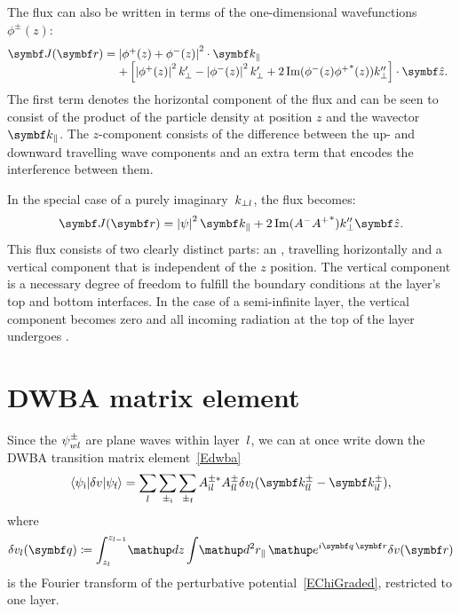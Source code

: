 The flux can also be written in terms of the one-dimensional wavefunctions $\phi^{\pm}(z)$:
\begin{equation}
  \begin{array}{@{}l@{\;}l}
  \v{J}(\r) =& \left|\phi^+(z)+\phi^-(z)\right|^2\cdot\k_\plll \\
  &+ \left[ \left|\phi^+(z)\right|^2 k_\perp' - \left|\phi^-(z)\right|^2 k_\perp' +
  2\Im(\phi^-(z){\phi^+}^*(z))k_\perp'' \right]\cdot \v{\hat z}.
  \end{array}
\end{equation}
The first term denotes the horizontal component of the flux and can be seen to consist of the product
of the particle density at position $z$ and the wavector $\k_\plll$. The $z$-component consists of the difference between the up- and downward travelling wave components and an extra term that encodes the interference between them.

In the special case of a purely imaginary~$k_{\perp l}$,
the flux becomes:
\begin{equation}
  \v{J}(\r) = \left| \psi \right|^2 \k_\plll + 2 \Im (A^-{A^+}^*) k_\perp''\v{\hat z}.
\end{equation}
This flux consists of two clearly distinct parts: an ,
%
travelling horizontally
 and a vertical component that is independent of the $z$ position. The vertical component is a necessary
 degree of freedom to fulfill the boundary conditions at the layer's top and bottom interfaces.
In the case of a semi-infinite layer, the vertical component becomes zero and
 all incoming radiation at the top of the layer undergoes .
%
\section{DWBA matrix element}

Since the $\psi^\pm_{wl}$ are plane waves within layer~$l$,
we can at once write down the DWBA transition matrix element~\cref{Edwba}
%
\begin{equation}\label{Edwba_ml0}
  \bra \psi_\ti|\delta v|\psi_\tf\ket
  = \sum_{\il} \sum_{\pm_\ti} \sum_{\pm_\tf}
    A^{\pm *}_{\ti \il} A^\pm_{\tf \il}
     \delta v_\il(\k^\pm_{\tf \il}-\k^\pm_{\ti \il}),
\end{equation}
where
\begin{equation}\label{Echij}
  \delta v_\il(\v{q})
  \coloneqq  \int_{z_\il}^{z_{\il-1}}\!\d z \int\!\d^2r_\plll\, \e^{i\v{q}\,\r}\delta v(\r)
\end{equation}
%
is the Fourier transform
of the perturbative potential~\cref{EChiGraded},
restricted to one layer.

